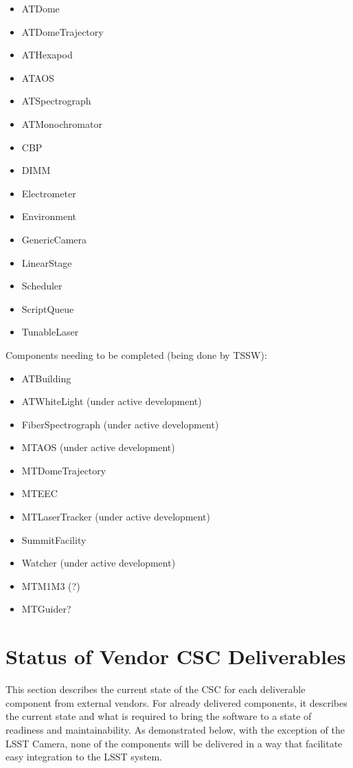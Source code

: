 \documentclass[TS,authoryear,toc]{lsstdoc}
\begin{document}
\begin{itemize}
    \item ATDome
    \item ATDomeTrajectory
    \item ATHexapod
    \item ATAOS
    \item ATSpectrograph
    \item ATMonochromator
    \item CBP
    \item DIMM
    \item Electrometer
    \item Environment 
    \item GenericCamera
    \item LinearStage
    \item Scheduler
    \item ScriptQueue
    \item TunableLaser
\end{itemize}

Components needing to be completed (being done by TSSW):

\begin{itemize}
    \item ATBuilding
    \item ATWhiteLight (under active development)
    \item FiberSpectrograph (under active development)
    \item MTAOS (under active development)
    \item MTDomeTrajectory
    \item MTEEC
    \item MTLaserTracker (under active development)
    \item SummitFacility
    \item Watcher (under active development)
    \item MTM1M3 (?)
    \item MTGuider?
\end{itemize}

\section{Status of Vendor CSC Deliverables}
This section describes the current state of the CSC for each deliverable component from external vendors. For already delivered components, it describes the current state and what is required to bring the software to a state of readiness and maintainability. As demonstrated below, with the exception of the LSST Camera, none of the components will be delivered in a way that facilitate easy integration to the LSST system.
\end{document}
